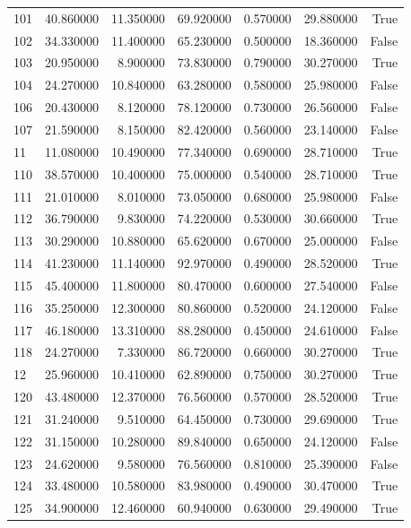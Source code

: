 \begin{table}
\begin{tabular}{lrrrrrr}
101 & 40.860000 & 11.350000 & 69.920000 & 0.570000 & 29.880000 & True \\
102 & 34.330000 & 11.400000 & 65.230000 & 0.500000 & 18.360000 & False \\
103 & 20.950000 & 8.900000 & 73.830000 & 0.790000 & 30.270000 & True \\
104 & 24.270000 & 10.840000 & 63.280000 & 0.580000 & 25.980000 & False \\
106 & 20.430000 & 8.120000 & 78.120000 & 0.730000 & 26.560000 & False \\
107 & 21.590000 & 8.150000 & 82.420000 & 0.560000 & 23.140000 & False \\
11 & 11.080000 & 10.490000 & 77.340000 & 0.690000 & 28.710000 & True \\
110 & 38.570000 & 10.400000 & 75.000000 & 0.540000 & 28.710000 & True \\
111 & 21.010000 & 8.010000 & 73.050000 & 0.680000 & 25.980000 & False \\
112 & 36.790000 & 9.830000 & 74.220000 & 0.530000 & 30.660000 & True \\
113 & 30.290000 & 10.880000 & 65.620000 & 0.670000 & 25.000000 & False \\
114 & 41.230000 & 11.140000 & 92.970000 & 0.490000 & 28.520000 & True \\
115 & 45.400000 & 11.800000 & 80.470000 & 0.600000 & 27.540000 & False \\
116 & 35.250000 & 12.300000 & 80.860000 & 0.520000 & 24.120000 & False \\
117 & 46.180000 & 13.310000 & 88.280000 & 0.450000 & 24.610000 & False \\
118 & 24.270000 & 7.330000 & 86.720000 & 0.660000 & 30.270000 & True \\
12 & 25.960000 & 10.410000 & 62.890000 & 0.750000 & 30.270000 & True \\
120 & 43.480000 & 12.370000 & 76.560000 & 0.570000 & 28.520000 & True \\
121 & 31.240000 & 9.510000 & 64.450000 & 0.730000 & 29.690000 & True \\
122 & 31.150000 & 10.280000 & 89.840000 & 0.650000 & 24.120000 & False \\
123 & 24.620000 & 9.580000 & 76.560000 & 0.810000 & 25.390000 & False \\
124 & 33.480000 & 10.580000 & 83.980000 & 0.490000 & 30.470000 & True \\
125 & 34.900000 & 12.460000 & 60.940000 & 0.630000 & 29.490000 & True \\

\end{tabular}
\end{table}
